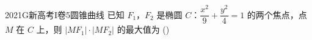 
\begin{problem}{2021}{G}{新高考I卷}{5}{圆锥曲线}
已知 $ F_1 $，$ F_2 $ 是椭圆 $ C $：$ \dfrac{x^2}{9}+\dfrac{y^2}{4}=1 $ 的两个焦点，点 $ M $ 在 $ C $ 上，则 $ |MF_1|\cdot|MF_2| $ 的最大值为 (\hspace{1cm})
\end{problem}

\begin{choices}
\end{choices}